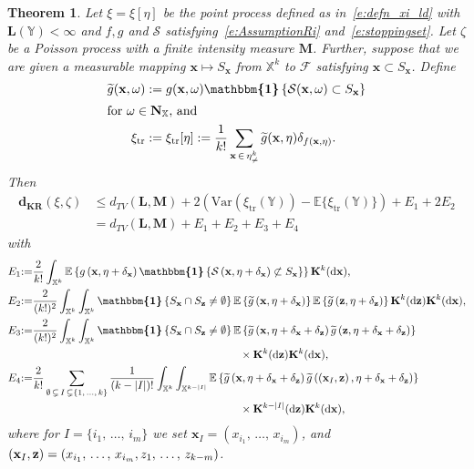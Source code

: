 \documentclass[10pt]{amsart}
\newtheorem{theo}{Theorem}[section]
\theoremstyle{definition}\newtheorem{defi}[theo]{Definition}\newtheorem{rema}[theo]{Remark}\newtheorem{exam}[theo]{Example}\newtheorem{exem}[theo]{Example}\newtheorem{nota}[theo]{Notation}
\newcommand*\bL{\mathbf{L}}
\newcommand*\bM{\mathbf{M}}
\newcommand*\bN{\mathbf{N}}
\newcommand*\bK{\mathbf{K}}
\newcommand{\bz}{\mathbf{z}}
\newcommand{\bx}{\mathbf{x}}
\newcommand*\dkr{\mathbf{d_{KR}}}
\newcommand*\X{\mathbb{X}}
\newcommand*\Y{\mathbb{Y}}
\newcommand{\E}{\mathbb{E}}
\newcommand*\cF{\mathcal{F}}
\newcommand*\cS{\mathcal{S}}
\newcommand{\tr}{\mathrm{tr}}
\newcommand*\md{\mathrm{d}}
\newcommand{\mean}[1] {\E\left\{{#1}\right\}}
\newcommand{\meanx}[1] {\E\{{#1}\}}
\newcommand{\ind}{\boldsymbol{\mathbbm{1}}}
\newcommand{\varx}[1]{\mathrm{Var}({#1})}
\newcommand{\set}[1]{\left\{#1\right\}}
\newcommand{\param}[1]{\left(#1\right)}
\newcommand{\tg}{\tilde{g}}
\let\oldtilde\tilde
\renewcommand*{\tilde}[1]{\mathchoice{\widetilde{#1}}{\widetilde{#1}}{\oldtilde{#1}}{\oldtilde{#1}}}
\begin{document}
\begin{theo}\label{t:qldep}
Let $\xi = \xi[\eta]$ be the point process defined as in~\eqref{e:defn_xi_ld} with $\bL(\Y)<\infty$ and $f,g$ and $\cS$ satisfying~\eqref{e:AssumptionRi} and~\eqref{e:stoppingset}. Let $\zeta$ be a Poisson process with {a finite} intensity measure $\bM$. Further, suppose that we are given a measurable mapping $\bx \mapsto S_{\bx}$ from $\X^k$ to $\cF$ satisfying {$\bx \subset S_{\bx}$.} Define
\begin{align*}
\tg(\bx,\omega) :=&\; g(\bx,\omega)\ind\set{\cS(\bx,\omega) \subset S_{\bx}}
\\
\intertext{for $\omega \in \bN_{\X}$, and}
\xi_{\tr} :=&\;\xi_{\tr}[\eta] := \frac{1}{k!}\sum_{\bx\, \in\,\eta^k_{\ne}}\tilde g(\bx,\eta)\delta_{f(\bx,\eta)}.
\end{align*}
Then
\begin{align*}
\dkr(\xi,\zeta) &\le d_{TV}(\bL,\bM) + 2\param{\varx{\xi_{\tr}(\Y)} - \meanx{\xi_{\tr}(\Y)} } + E_1 + 2E_2\\
&= d_{TV}(\bL,\bM) + E_1 + E_2 + E_3 + E_4
\end{align*}
with
\begin{align*}
E_1 & {:=} \frac{2}{k!} \int_{\X^k} \mean{g\left(\bx,\eta+\delta_{\bx}\right) \ind\set{\cS\left(\bx,\eta+\delta_{\bx}\right)\not\subset S_{\bx}}} \bK^k(\md\bx), \allowdisplaybreaks \\
E_2 & {:=} \frac{2}{(k!)^2} \int_{\X^{k}} \int_{\X^{k}} \ind\set{S_{\bx}\cap S_{\bz}\ne \emptyset} \mean{\tg\left(\bx,\eta+\delta_{\bx}\right)} \mean{\tg\left(\bz,\eta+\delta_{\bz}\right)} \bK^k(\md \bz)\bK^k(\md \bx), \allowdisplaybreaks \\
E_3 & {:=} \frac{2}{(k!)^2} \int_{\X^{k}} \int_{\X^{k}} \ind\set{S_{\bx}\cap S_{\bz}\ne \emptyset} \mean{\tg\left(\bx,\eta+\delta_{\bx}+\delta_{\bz}\right)\tg\left(\bz,\eta+\delta_{\bx}+\delta_{\bz}\right)}\\
&\hspace{7cm}\times\bK^k(\md\bz)\bK^k(\md\bx), \allowdisplaybreaks \\
E_4 & {:=} \frac{2}{k!}\sum_{\emptyset\,\subsetneq\,I\,\subsetneq {\{1,\,\hdots,\,k\}}} \frac{1}{(k-|I|)!} \int_{\X^k}\int_{\X^{k-|I|}}\mean{ \tg\left(\bx, \eta+\delta_{\bx}+\delta_{\bz}\right) \tg\left(\left(\bx_{I},\bz\right),\eta+\delta_{\bx}+\delta_{\bz}\right)} \\
& \hspace{7cm} \times \bK^{k-|I|}(\md\bz) \bK^k(\md\bx),
\end{align*}
where for $I = \{i_1,\,\ldots,\,i_m\}$ we set $\bx_I = (x_{i_1},\,\ldots,\,x_{i_m})$, and $(\bx_I,\bz) = (x_{i_1},\,\ldots,\,x_{i_m},\linebreak z_1,\,\ldots,\, z_{k-m})$.
\end{theo} 
\end{document}
